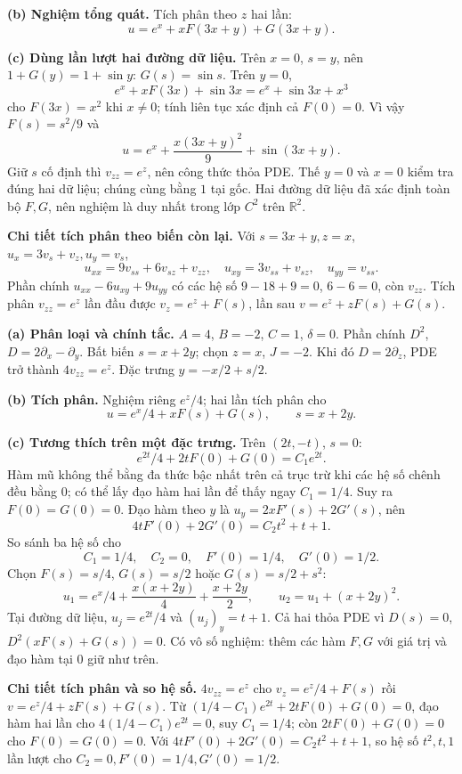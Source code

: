 \textbf{(b) Nghiệm tổng quát.} Tích phân theo $z$ hai lần:
\[u=e^x+xF(3x+y)+G(3x+y).\]

\textbf{(c) Dùng lần lượt hai đường dữ liệu.} Trên $x=0$, $s=y$, nên $1+G(y)=1+\sin y$: $G(s)=\sin s$. Trên $y=0$,
\[e^x+xF(3x)+\sin3x=e^x+\sin3x+x^3\]
cho $F(3x)=x^2$ khi $x\ne0$; tính liên tục xác định cả $F(0)=0$. Vì vậy $F(s)=s^2/9$ và
\[\boxed{u=e^x+\frac{x(3x+y)^2}{9}+\sin(3x+y).}\]
Giữ $s$ cố định thì $v_{zz}=e^z$, nên công thức thỏa PDE. Thế $y=0$ và $x=0$ kiểm tra đúng hai dữ liệu; chúng cùng bằng $1$ tại gốc. Hai đường dữ liệu đã xác định toàn bộ $F,G$, nên nghiệm là duy nhất trong lớp $C^2$ trên $\mathbb R^2$.

\textbf{Chi tiết tích phân theo biến còn lại.} Với $s=3x+y,z=x$, $u_x=3v_s+v_z,u_y=v_s$,
\[u_{xx}=9v_{ss}+6v_{sz}+v_{zz},\quad u_{xy}=3v_{ss}+v_{sz},\quad u_{yy}=v_{ss}.\]
Phần chính $u_{xx}-6u_{xy}+9u_{yy}$ có các hệ số $9-18+9=0$, $6-6=0$, còn $v_{zz}$. Tích phân $v_{zz}=e^z$ lần đầu được $v_z=e^z+F(s)$, lần sau $v=e^z+zF(s)+G(s)$.

\textbf{(a) Phân loại và chính tắc.} $A=4$, $B=-2$, $C=1$, $\delta=0$. Phần chính $D^2$, $D=2\partial_x-\partial_y$. Bất biến $s=x+2y$; chọn $z=x$, $J=-2$. Khi đó $D=2\partial_z$, PDE trở thành $4v_{zz}=e^z$. Đặc trưng $y=-x/2+s/2$.

\textbf{(b) Tích phân.} Nghiệm riêng $e^z/4$; hai lần tích phân cho
\[u=e^x/4+xF(s)+G(s),\qquad s=x+2y.\]

\textbf{(c) Tương thích trên một đặc trưng.} Trên $(2t,-t)$, $s=0$:
\[e^{2t}/4+2tF(0)+G(0)=C_1e^{2t}.\]
Hàm mũ không thể bằng đa thức bậc nhất trên cả trục trừ khi các hệ số chênh đều bằng $0$; có thể lấy đạo hàm hai lần để thấy ngay $C_1=1/4$. Suy ra $F(0)=G(0)=0$. Đạo hàm theo $y$ là $u_y=2xF'(s)+2G'(s)$, nên
\[4tF'(0)+2G'(0)=C_2t^2+t+1.\]
So sánh ba hệ số cho
\[\boxed{C_1=1/4,\quad C_2=0,\quad F'(0)=1/4,\quad G'(0)=1/2.}\]
Chọn $F(s)=s/4$, $G(s)=s/2$ hoặc $G(s)=s/2+s^2$:
\[u_1=e^x/4+\frac{x(x+2y)}4+\frac{x+2y}2,\qquad u_2=u_1+(x+2y)^2.\]
Tại đường dữ liệu, $u_j=e^{2t}/4$ và $(u_j)_y=t+1$. Cả hai thỏa PDE vì $D(s)=0$, $D^2(xF(s)+G(s))=0$. Có vô số nghiệm: thêm các hàm $F,G$ với giá trị và đạo hàm tại $0$ giữ như trên.

\textbf{Chi tiết tích phân và so hệ số.} $4v_{zz}=e^z$ cho $v_z=e^z/4+F(s)$ rồi $v=e^z/4+zF(s)+G(s)$. Từ $(1/4-C_1)e^{2t}+2tF(0)+G(0)=0$, đạo hàm hai lần cho $4(1/4-C_1)e^{2t}=0$, suy $C_1=1/4$; còn $2tF(0)+G(0)=0$ cho $F(0)=G(0)=0$. Với $4tF'(0)+2G'(0)=C_2t^2+t+1$, so hệ số $t^2,t,1$ lần lượt cho $C_2=0,F'(0)=1/4,G'(0)=1/2$.

